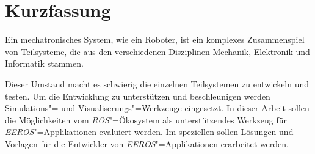 \chapter*{Kurzfassung}



Ein mechatronisches System, wie ein Roboter, ist ein komplexes Zusammenspiel von Teilsysteme, die aus den verschiedenen Disziplinen Mechanik, Elektronik und Informatik stammen.




Dieser Umstand macht es schwierig die einzelnen Teilsystemen zu entwickeln und testen.
Um die Entwicklung zu unterstützen und beschleunigen werden Simulations"= und Visualiserungs"=Werkzeuge eingesetzt.
In dieser Arbeit sollen die Möglichkeiten vom \textit{ROS}"=Ökosystem als unterstützendes Werkzeug für \textit{EEROS}"=Applikationen evaluiert werden.
Im speziellen sollen Lösungen und Vorlagen für die Entwickler von \textit{EEROS}"=Applikationen erarbeitet werden.


